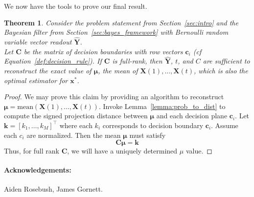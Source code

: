 \documentclass[12pt]{article}
\newtheorem{theorem}{Theorem}
\begin{document}
We now have the tools to prove our final result. 

\begin{theorem}
	\label{thm:main}
	Consider the problem statement from Section~\ref{sec:intro} and the Bayesian filter from Section~\ref{sec:bayes_framework} with Bernoulli random variable vector readout $\hat{\mathbf Y}$. \\
	
	Let $\mathbf C$ be the matrix of decision boundaries with row vectors $\mathbf c_i$ (cf Equation~\ref{def:decision_rule}). 
	If $\mathbf C$ is full-rank, then $\hat{\mathbf Y}$, $t$, and $C$ are sufficient to reconstruct the exact value of $\mathbf \mu$, the mean of $\mathbf X(1), \dots, \mathbf X(t)$, which is also the optimal estimator for $\mathbf x^*$. 
\end{theorem}
\begin{proof}
	We may prove this claim by providing an algorithm to reconstruct $\mathbf \mu = \text{mean}(\mathbf X(1), \dots, \mathbf X(t))$.
	Invoke Lemma~\ref{lemma:prob_to_dist} to compute the signed projection distance between $\mathbf \mu$ and each decision plane $\mathbf c_i$.
	Let $\mathbf k = [k_1, \dots, k_M]^\top$ where each $k_i$ corresponds to decision boundary $\mathbf c_i$.
	Assume each $c_i$ are normalized. Then the mean $\mathbf \mu$ must satisfy 
	\begin{equation}
		\label{eqn:final_lin_sys}
		\mathbf {C \mu} = \mathbf k
	\end{equation}
	Thus, for full rank $\mathbf C$, we will have a uniquely determined $\mu$ value. 
\end{proof}














\paragraph{Acknowledgements: } Aiden Rosebush, James Gornett. 
\end{document}
